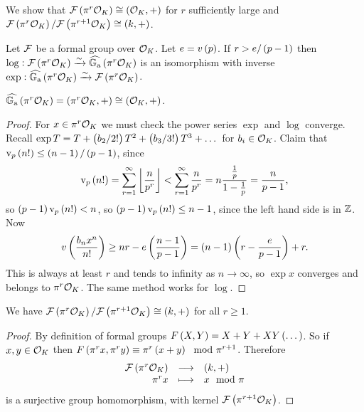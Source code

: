 \pagebreak

We show that $ \FFF\br{\pi^r\OOO_K} \cong \br{\OOO_K, +} $ for $ r $ sufficiently large and $ \FFF\br{\pi^r\OOO_K} / \FFF\br{\pi^{r + 1}\OOO_K} \cong \br{k, +} $.


\begin{theorem}
Let $ \mathcal{F} $ be a formal group over $ \mathcal{O}_K $. Let $ e = v\br{p} $. If $ r > e / \br{p - 1} $ then $ \log : \FFF\br{\pi^r\OOO_K} \xrightarrow{\sim} \widehat{\GG_\a}\br{\pi^r\OOO_K} $ is an isomorphism with inverse $ \exp : \widehat{\GG_\a}\br{\pi^r\OOO_K} \xrightarrow{\sim} \FFF\br{\pi^r\OOO_K} $.
\end{theorem}

\begin{remark*}
$ \widehat{\GG_\a}\br{\pi^r\OOO_K} = \br{\pi^r\OOO_K, +} \cong \br{\OOO_K, +} $.
\end{remark*}

\begin{proof}
For $ x \in \pi^r\mathcal{O}_K $ we must check the power series $ \exp $ and $ \log $ converge. Recall $ \exp T = T + \br{b_2 / 2!}T^2 + \br{b_3 / 3!}T^3 + \dots $ for $ b_i \in \mathcal{O}_K $. Claim that $ \v_p\br{n!} \le \br{n - 1} / \br{p - 1} $, since
$$ \v_p\br{n!} = \sum_{r = 1}^\infty \fbr{\dfrac{n}{p^r}} < \sum_{r = 1}^\infty \dfrac{n}{p^r} = n\dfrac{\tfrac{1}{p}}{1 - \tfrac{1}{p}} = \dfrac{n}{p - 1}, $$
so $ \br{p - 1}\v_p\br{n!} < n $, so $ \br{p - 1}\v_p\br{n!} \le n - 1 $, since the left hand side is in $ \mathbb{Z} $. Now
$$ v\br{\dfrac{b_nx^n}{n!}} \ge nr - e\br{\dfrac{n - 1}{p - 1}} = \br{n - 1}\br{r - \dfrac{e}{p - 1}} + r. $$
This is always at least $ r $ and tends to infinity as $ n \to \infty $, so $ \exp x $ converges and belongs to $ \pi^r\mathcal{O}_K $. The same method works for $ \log $.
\end{proof}

\begin{lemma}
We have $ \FFF\br{\pi^r\OOO_K} / \FFF\br{\pi^{r + 1}\OOO_K} \cong \br{k, +} $ for all $ r \ge 1 $.
\end{lemma}

\begin{proof}
By definition of formal groups $ F\br{X, Y} = X + Y + XY\br{\dots} $. So if $ x, y \in \mathcal{O}_K $ then $ F\br{\pi^rx, \pi^ry} \equiv \pi^r\br{x + y} \mod \pi^{r + 1} $. Therefore
$$ \function{\FFF\br{\pi^r\OOO_K}}{\br{k, +}}{\pi^rx}{x \mod \pi} $$
is a surjective group homomorphism, with kernel $ \FFF\br{\pi^{r + 1}\OOO_K} $.
\end{proof}

